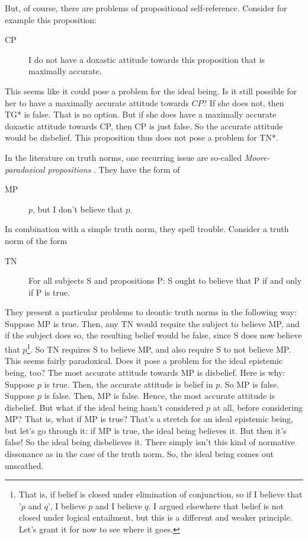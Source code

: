 \documentclass[12pt,numbers=noenddot]{scrartcl}
\begin{document}
But, of course, there are problems of propositional self-reference. Consider for example this proposition:
\begin{description}
    \item[CP] I do not have a doxastic attitude towards this proposition that is maximally accurate.
\end{description}

This seems like it could pose a problem for the ideal being. Is it still possible for her to have a maximally accurate attitude towards $CP$?
If she does not, then TG* is false. That is no option. But if she does have a maximally accurate doxastic attitude towards CP, then CP is just false. So the accurate attitude would be disbelief. This proposition thus does not pose a problem for TN*.

In the literature on truth norms, one recurring issue are so-called \emph{Moore-paradoxical propositions} \autocite[6]{Wedgwood2013-WEDTRT}. They have the form of 
\begin{description}
    \item[MP] $p$, but I don't believe that $p$.
\end{description}
In combination with a simple truth norm, they spell trouble. Consider a truth norm of the form
\begin{description}
    \item[TN] For all subjects S and propositions P: S ought to believe that P if and only if P is true.
\end{description}

They present a particular problems to deontic truth norms in the following way: Suppose MP is true. Then, any TN would require the subject to believe MP, and if the subject does so, the resulting belief would be false, since S does now believe that $p$\footnote{That is, if belief is closed under elimination of conjunction, so if I believe that '$p$ and $q$', I believe $p$ and I believe $q$. I argued elsewhere that belief is not closed under logical entailment, but this is a different and weaker principle. Let's grant it for now to see where it goes.}. So TN requires S to believe MP, and also require S to not believe MP. This seems fairly paradoxical. Does it pose a problem for the ideal epistemic being, too? The most accurate attitude towards MP is disbelief. Here is why: Suppose $p$ is true. Then, the accurate attitude is belief in $p$. So MP is false. Suppose $p$ is false. Then, MP is false. Hence, the most accurate attitude is disbelief. But what if the ideal being hasn't considered $p$ at all, before considering MP? That is, what if MP is true? That's a stretch for an ideal epistemic being, but let's go through it: if MP is true, the ideal being believes it. But then it's false! So the ideal being disbelieves it. There simply isn't this kind of normative dissonance as in the case of the truth norm. So, the ideal being comes out unscathed.
\end{document}
